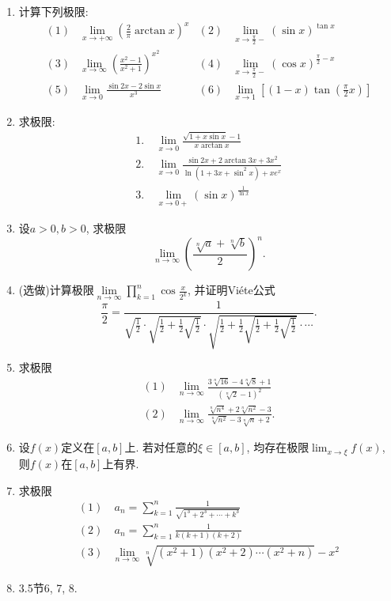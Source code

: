 \documentclass[UTF8,11pt, a4paper, oneside, fontset=none]{ctexbook}
\begin{document}
\begin{enumerate}


\item 计算下列极限:
\begin{align*}
(1) & \lim_{x \to +\infty} \left( \frac{2}{\pi} \arctan x\right)^x  & (2) & \lim_{x \to \frac{\pi}{2}-} (\sin x )^{\tan x}\\
(3) & \lim_{x \to \infty} \left( \frac{x^2 -1}{x^2 +1}\right)^{x^2} & (4) & \lim_{x \to \frac{\pi}{2}-} (\cos x)^{\frac{\pi}{2} - x} \\
(5) & \lim_{x \to 0} \frac{\sin 2x - 2 \sin x}{x^3} & (6) & \lim_{x \to 1} \left[(1-x)\tan\left(\frac{\pi}{2}x\right) \right]
\end{align*}


\item 求极限: 
\begin{align*}
1. & \ \lim_{x \to 0} \frac{\sqrt{1 + x \sin x} -1}{x \arctan x}\\
2. & \ \lim_{x \to 0} \frac{\sin 2x + 2 \arctan 3x + 3x^2}{\ln(1 + 3x + \sin^2 x) + xe^x} \\
3. & \ \lim_{x \to 0+}(\sin x)^{\frac{1}{\ln x}}
\end{align*}

\item 设$a>0, b>0$, 求极限
\[
\lim_{n \to \infty} \left( \frac{\sqrt[n]{a} + \sqrt[n]{b}}{2} \right)^n.
\]

\item (选做)计算极限$\lim\limits_{n \to \infty}\prod_{k=1}^n \cos \frac{x}{2^k}$, 并证明Vi\'ete公式
\[
\frac{\pi}{2} = \frac{1}{\sqrt{\frac{1}{2}} \cdot \sqrt{\frac{1}{2} + \frac{1}{2}\sqrt{\frac{1}{2}}} \cdot \sqrt{\frac{1}{2} + \frac{1}{2}\sqrt{\frac{1}{2} + \frac{1}{2}\sqrt{\frac{1}{2}}}} \cdot \cdots}.
\]

\item 求极限
\begin{align*}
(1) & \lim_{n \to \infty} \frac{3 \sqrt[n]{16} - 4 \sqrt[n]{8} +1}{(\sqrt[n]{2}-1)^2} \\
(2) & \lim_{n \to \infty}\frac{\sqrt[n]{n^4} + 2 \sqrt[n]{n^2} -3}{\sqrt[n]{n^2} - 3 \sqrt[n]{n} +2}.
\end{align*}

\item 设$f(x)$定义在$[a, b]$上. 若对任意的$\xi \in [a, b]$, 均存在极限$\lim_{x \to \xi}f(x)$, 则$f(x)$在$[a, b]$上有界.

\item 求极限
\begin{align*}
(1) & \ a_n = \sum_{k=1}^n \frac{1}{\sqrt{1^3 + 2^3 + \cdots + k^3}} \\ 
(2) & \ a_n = \sum_{k=1}^n \frac{1}{k(k+1)(k+2)}\\
(3) & \lim_{n \to \infty} \sqrt[n]{(x^2 + 1)(x^2 + 2) \cdots (x^2 + n)} - x^2
\end{align*}

\item 3.5节6, 7, 8.

\end{enumerate}
\end{document}
